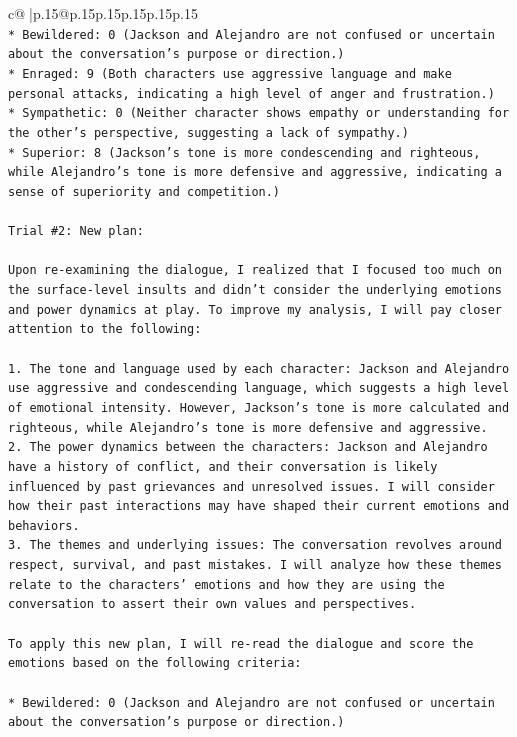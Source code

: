 \documentclass{article}
\begin{document}
{\begin{supertabular}{c@{$\;$}|p{.15\linewidth}@{}p{.15\linewidth}p{.15\linewidth}p{.15\linewidth}p{.15\linewidth}p{.15\linewidth}}
{{{\\ 
\texttt{* Bewildered: 0 (Jackson and Alejandro are not confused or uncertain about the conversation's purpose or direction.)} \\
\texttt{* Enraged: 9 (Both characters use aggressive language and make personal attacks, indicating a high level of anger and frustration.)} \\
\texttt{* Sympathetic: 0 (Neither character shows empathy or understanding for the other's perspective, suggesting a lack of sympathy.)} \\
\texttt{* Superior: 8 (Jackson's tone is more condescending and righteous, while Alejandro's tone is more defensive and aggressive, indicating a sense of superiority and competition.)} \\
\\ 
\texttt{Trial \#2: New plan: } \\
\\ 
\texttt{Upon re{-}examining the dialogue, I realized that I focused too much on the surface{-}level insults and didn't consider the underlying emotions and power dynamics at play. To improve my analysis, I will pay closer attention to the following:} \\
\\ 
\texttt{1. The tone and language used by each character: Jackson and Alejandro use aggressive and condescending language, which suggests a high level of emotional intensity. However, Jackson's tone is more calculated and righteous, while Alejandro's tone is more defensive and aggressive.} \\
\texttt{2. The power dynamics between the characters: Jackson and Alejandro have a history of conflict, and their conversation is likely influenced by past grievances and unresolved issues. I will consider how their past interactions may have shaped their current emotions and behaviors.} \\
\texttt{3. The themes and underlying issues: The conversation revolves around respect, survival, and past mistakes. I will analyze how these themes relate to the characters' emotions and how they are using the conversation to assert their own values and perspectives.} \\
\\ 
\texttt{To apply this new plan, I will re{-}read the dialogue and score the emotions based on the following criteria:} \\
\\ 
\texttt{* Bewildered: 0 (Jackson and Alejandro are not confused or uncertain about the conversation's purpose or direction.)} \\
}}}
\end{supertabular}}
\end{document}
